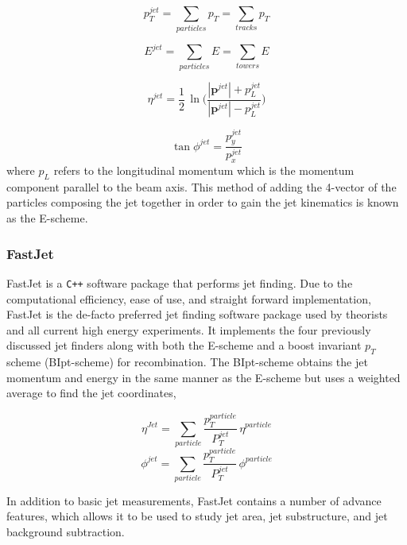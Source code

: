 \begin{equation}
p_{T}^{jet} = \sum_{particles} p_{T} = \sum_{tracks} p_{T}
\label{eq:JePt}
\end{equation}

\begin{equation}
E^{jet} = \sum_{particles} E = \sum_{towers} E
\label{eq:JetE}
\end{equation}

\begin{equation}
\eta^{jet} = \frac{1}{2} \, \ln \Bigg (  \frac{|\boldsymbol{p}^{jet}| + p_{L}^{jet}}{|\boldsymbol{p}^{jet}| - p_{L}^{jet}}  \Bigg )
\label{eq:JetEta}
\end{equation}

\begin{equation}
\tan \phi^{jet} = \frac{p_{y}^{jet}}{p_{x}^{jet}}
\label{eq:JetPhi}
\end{equation}
\noindent 
where $p_{L}$ refers to the longitudinal momentum which is the momentum component parallel to the beam axis.  This method of adding the 4-vector of the particles composing the jet together in order to gain the jet kinematics is known as the E-scheme\cite{Cacciari:2011ma}.

\subsubsection{FastJet}
FastJet\cite{Cacciari:2011ma} is a \verb|C++| software package that performs jet finding.  Due to the computational efficiency, ease of use, and straight forward implementation, FastJet is the de-facto preferred jet finding software package used by theorists and all current high energy experiments. It implements the four previously discussed jet finders along with both the E-scheme and a boost invariant $p_{T}$ scheme (BIpt-scheme) for recombination.  The BIpt-scheme obtains the jet momentum and energy in the same manner as the E-scheme but uses a weighted average to find the jet coordinates,

\begin{equation}
\eta^{Jet} = \sum_{particle} \frac{p_{T}^{particle}}{P_{T}^{jet}} \, \eta^{particle}
\label{eq:JetEtaRecom}
\end{equation}
\begin{equation}
\phi^{jet} = \sum_{particle} \frac{p_{T}^{particle}}{P_{T}^{jet}} \, \phi^{particle}
\label{eq:JetPhiRecom}
\end{equation}

\noindent
In addition to basic jet measurements, FastJet contains a number of advance features, which allows it to be used to study jet area, jet substructure, and jet background subtraction\cite{Connors:2017ptx}.

